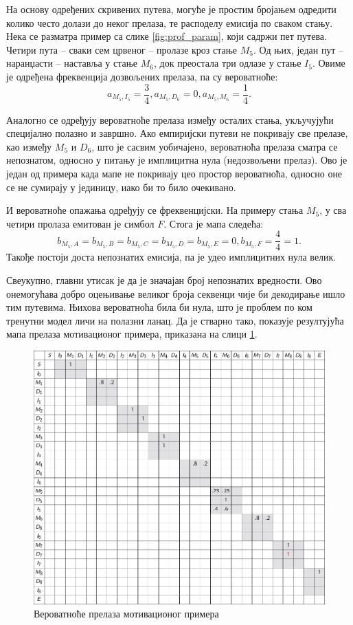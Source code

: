 \documentclass[12pt,oneside]{memoir}
\begin{document}
\begin{CJK}{UTF8}{ipxm}
На основу одређених скривених путева, могуће је простим бројањем одредити колико често долази до неког прелаза, те расподелу емисија по сваком стању. Нека се разматра пример са слике \ref{fig:prof_param}, који садржи пет путева. Четири пута -- сваки сем црвеног -- пролазе кроз стање $M_5$. Од њих, један пут -- наранџасти -- наставља у стање $M_6$, док преостала три одлазе у стање $I_5$. Овиме је одређена фреквенција дозвољених прелаза, па су вероватноће: $$a_{M_5, I_5} = \frac{3}{4}, a_{M_5, D_6} = 0, a_{M_5, M_6} = \frac{1}{4}.$$

Аналогно се одређују вероватноће прелаза између осталих стања, укључујући специјално полазно и завршно. Ако емпиријски путеви не покривају све прелазе, као између $M_5$ и $D_6$, што је сасвим уобичајено, вероватноћа прелаза сматра се непознатом, односно у питању је имплицитна нула (недозвољени прелаз). Ово је један од примера када мапе не покривају цео простор вероватноћа, односно оне се не сумирају у јединицу, иако би то било очекивано.

И вероватноће опажања одређују се фреквенцијски. На примеру стања $M_5$, у сва четири пролаза емитован је симбол $F$. Стога је мапа следећа: $$b_{M_5, A} = b_{M_5, B} = b_{M_5, C} = b_{M_5, D}= b_{M_5, E} = 0, b_{M_5, F} = \frac{4}{4} = 1.$$ Такође постоји доста непознатих емисија, па је удео имплицитних нула велик.

Свеукупно, главни утисак је да је значајан број непознатих вредности. Ово онемогућава добро оцењивање великог броја секвенци чије би декодирање ишло тим путевима. Њихова вероватноћа била би нула, што је проблем по ком тренутни модел личи на полазни ланац. Да је стварно тако, показује резултујућа мапа прелаза мотивационог примера, приказана на слици \ref{fig:prelazi}.

\begin{figure}[H]
  \centering
  \includegraphics[width=\textwidth]{prelazi.png}
  \caption{Вероватноће прелаза мотивационог примера\cite{compeau2015}}
  \label{fig:prelazi}
\end{figure}


\end{CJK}
\end{document}
